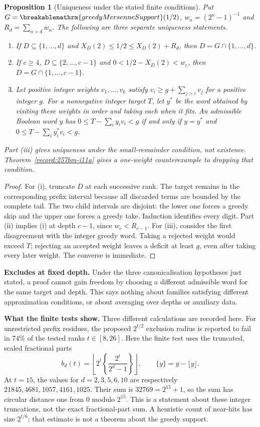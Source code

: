 \documentclass[11pt]{article}
\theoremstyle{plain}
\newtheorem{prop}[thm]{Proposition}
\theoremstyle{definition}
\theoremstyle{remark}
\renewcommand{\mathrm}[1]{\ifmmode\breakablemathrm{#1}\else\textrm{#1}\fi}%
\begin{document}
\begin{prop}[Uniqueness under the stated finite conditions]
\label{prop:canon}
Put $G=\mathrm{greedyMersenneSupport}(1/2)$,
$w_n=(2^n-1)^{-1}$ and $R_d=\sum_{n>d}w_n$.
The following are three separate uniqueness statements.
\begin{enumerate}[nosep,label=(\roman*)]
\item If $D\subseteq\{1,\ldots,d\}$ and
$X_D(2)\le1/2\le X_D(2)+R_d$, then $D=G\cap\{1,\ldots,d\}$.
\item If $c\ge4$, $D\subseteq\{2,\ldots,c-1\}$ and
$0<1/2-X_D(2)<w_c$, then $D=G\cap\{1,\ldots,c-1\}$.
\item Let positive integer weights $v_1,\ldots,v_k$ satisfy
$v_i\ge g+\sum_{j>i}v_j$ for a positive integer $g$.
For a nonnegative integer target $T$, let $y^*$ be the word obtained by
visiting these weights in order and taking each when it fits.
An admissible Boolean word $y$ has
$0\le T-\sum_i y_iv_i<g$ if and only if $y=y^*$ and
$0\le T-\sum_i y_i^*v_i<g$.
\end{enumerate}
Part (iii) gives uniqueness under the small-remainder condition,
not existence.  Theorem~\ref{record:257bm-i11a} gives a
one-weight counterexample to dropping that condition.
\end{prop}
\begin{proof}
For (i), truncate $D$ at each successive rank.  The target remains
in the corresponding prefix interval because all discarded terms
are bounded by the complete tail.  The two child intervals are
disjoint: the lower one forces a greedy skip and the upper one
forces a greedy take.  Induction identifies every digit.
Part (ii) implies (i) at depth $c-1$, since $w_c<R_{c-1}$.
For (iii), consider the first disagreement with the integer greedy
word.  Taking a rejected weight would exceed $T$; rejecting an accepted
weight leaves a deficit at least $g$, even after taking every later
weight.  The converse is immediate.
\end{proof}

\textbf{Excludes at fixed depth.} Under the three canonicalisation
hypotheses just stated, a proof cannot gain freedom by choosing a different
admissible word for the same target and depth.  This says nothing about
families satisfying different approximation conditions, or about averaging
over depths or auxiliary data.

\textbf{What the finite tests show.} Three different calculations are
recorded here.  For unrestricted prefix residues, the proposed
$2^{t/2}$ exclusion radius is reported to fail in $74\%$ of the tested
ranks $t\in[8,26]$.  Here the finite test uses the truncated,
scaled fractional parts
\[
 b_d(t)=\left\lfloor 2^t\left\{\frac{2^t}{2^d-1}\right\}\right\rfloor,
 \qquad \{y\}=y-\lfloor y\rfloor.
\]
At $t=15$, the values for $d=2,3,5,6,10$ are respectively
$21845,4681,1057,4161,1025$.  Their sum is $32769=2^{15}+1$,
so the sum has circular distance one from $0$ modulo $2^{15}$.
This is a statement about these integer truncations, not the exact
fractional-part sum.  A heuristic count of near-hits has
size $2^{t/6}$; that estimate is not a theorem about the greedy support.
\end{document}
